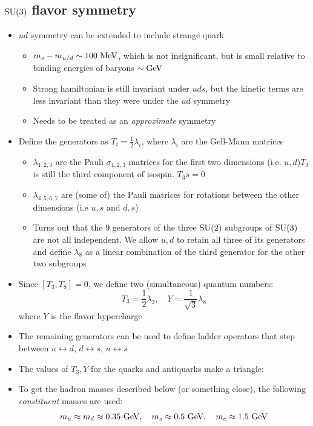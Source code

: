 \subsection{$\operatorname{SU}(3)$ flavor symmetry}
\begin{itemize}
  \item $ud$ symmetry can be extended to include strange quark
  \begin{itemize}
    \item $m_s - m_{u/d}\sim100~\text{MeV}$, which is not insignificant, but is small relative to binding energies of baryons $\sim\text{GeV}$
    \item Strong hamiltonian is still invariant under $uds$, but the kinetic terms are less invariant than they were under the $ud$ symmetry
    \item Needs to be treated as an \emph{approximate} symmetry
  \end{itemize}
  \item Define the generators as $T_i = \frac{1}{2}\lambda_i$, where $\lambda_i$ are the Gell-Mann matrices
  \begin{itemize}
    \item $\lambda_{1,2,3}$ are the Pauli $\sigma_{1,2,3}$ matrices for the first two dimensions (i.e. $u,d$)\thus $T_3$ is still the third component of isospin. $T_3s = 0$
    \item $\lambda_{4,5,6,7}$ are (some of) the Pauli matrices for rotations between the other dimensions (i.e $u,s$ and $d,s$)
    \item Turns out that the $9$ generators of the three $\operatorname{SU}(2)$ subgroups of $\operatorname{SU}(3)$ are not all independent. We allow $u,d$ to retain all three of its generators and define $\lambda_8$ as a linear combination of the third generator for the other two subgroups
  \end{itemize}
  \item Since $[T_3,T_8]=0$, we define two (simultaneous) quantum numbers:
  \begin{equation}
    T_3 = \frac{1}{2}\lambda_3,\quad Y = \frac{1}{\sqrt3}\lambda_8
  \end{equation}
  where $Y$ is the flavor hypercharge
  \item The remaining generators can be used to define ladder operators that step between $u\leftrightarrow d$, $d\leftrightarrow s$, $u\leftrightarrow s$
  \item The values of $T_3,Y$ for the quarks and antiquarks make a triangle:
  \item To get the hadron masses described below (or something close), the following \emph{constituent} masses are used:
  \begin{equation}
    m_u \approx m_d \approx 0.35~\text{GeV}, \quad m_s \approx 0.5~\text{GeV}, \quad m_c \approx 1.5~\text{GeV}
  \end{equation}
\end{itemize}

